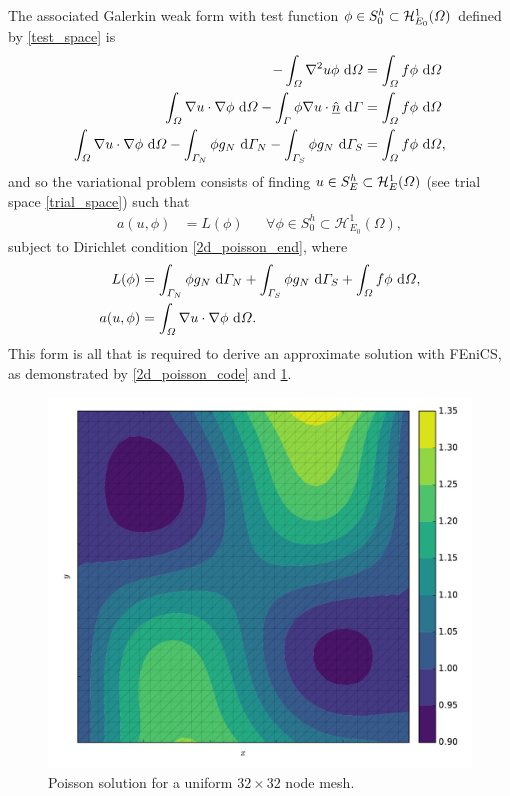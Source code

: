 The associated Galerkin weak form with test function $\phi \in S_0^h \subset \mathcal{H}_{E_0}^1(\varOmega)$ defined by \cref{test_space} is
\begin{align*}
  -\int_{\varOmega} \nabla^2 u \phi \ \mathrm{d}\varOmega &= \int_{\varOmega} f \phi \ \mathrm{d}\varOmega \\
  \int_{\varOmega} \nabla u \cdot \nabla \phi \ \mathrm{d}\varOmega - \int_{\varGamma} \phi \nabla u \cdot \underline{\hat{n}} \ \mathrm{d}\varGamma &= \int_{\varOmega} f \phi \ \mathrm{d}\varOmega \\
  \int_{\varOmega} \nabla u \cdot \nabla \phi \ \mathrm{d}\varOmega - \int_{\varGamma_N} \phi g_N \ \mathrm{d}\varGamma_N - \int_{\varGamma_S} \phi g_N \ \mathrm{d}\varGamma_S &= \int_{\varOmega} f \phi \ \mathrm{d}\varOmega,
\end{align*}
and so the variational problem consists of finding $u \in S_E^h \subset \mathcal{H}_E^1(\varOmega)$ (see trial space \cref{trial_space}) such that
\begin{align*}
  a(u,\phi) &= L(\phi) && \forall \phi \in S_0^h \subset \mathcal{H}_{E_0}^1(\Omega),
\end{align*}
subject to Dirichlet condition \cref{2d_poisson_end}, where
\begin{align*}
  L(\phi) &= \int_{\varGamma_N} \phi g_N \ \mathrm{d}\varGamma_N + \int_{\varGamma_S} \phi g_N \ \mathrm{d}\varGamma_S + \int_{\varOmega} f \phi \ \mathrm{d}\varOmega, \\
  a(u,\phi) &= \int_{\varOmega} \nabla u \cdot \nabla \phi \ \mathrm{d}\varOmega.
\end{align*}
This form is all that is required to derive an approximate solution with FEniCS, as demonstrated by \cref{2d_poisson_code} and \cref{2d_poisson_image}.


\begin{figure}
  \centering
    \includegraphics[width=\linewidth]{images/fenics_intro/2Dpoisson.pdf}
  \caption[Two-dimension Poisson example]{Poisson solution for a uniform $32 \times 32$ node mesh.}
  \label{2d_poisson_image}
\end{figure}




